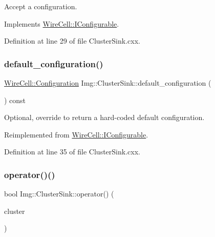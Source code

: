 Accept a configuration. 



Implements \hyperlink{class_wire_cell_1_1_i_configurable_a57ff687923a724093df3de59c6ff237d}{Wire\+Cell\+::\+I\+Configurable}.



Definition at line 29 of file Cluster\+Sink.\+cxx.

\mbox{\label{class_wire_cell_1_1_img_1_1_cluster_sink_a78a90dd617b3aad0933c1d0f8fc055a7}} 
\subsubsection{\texorpdfstring{default\+\_\+configuration()}{default\_configuration()}}
{\footnotesize\ttfamily \hyperlink{namespace_wire_cell_a9f705541fc1d46c608b3d32c182333ee}{Wire\+Cell\+::\+Configuration} Img\+::\+Cluster\+Sink\+::default\+\_\+configuration (\begin{DoxyParamCaption}{ }\end{DoxyParamCaption}) const\hspace{0.3cm}{\ttfamily [virtual]}}



Optional, override to return a hard-\/coded default configuration. 



Reimplemented from \hyperlink{class_wire_cell_1_1_i_configurable_a54841b2da3d1ea02189478bff96f7998}{Wire\+Cell\+::\+I\+Configurable}.



Definition at line 35 of file Cluster\+Sink.\+cxx.

\mbox{\label{class_wire_cell_1_1_img_1_1_cluster_sink_aacf43e19e297947a4dd80e54ee8775f6}} 
\subsubsection{\texorpdfstring{operator()()}{operator()()}}
{\footnotesize\ttfamily bool Img\+::\+Cluster\+Sink\+::operator() (\begin{DoxyParamCaption}\item[{const \hyperlink{class_wire_cell_1_1_i_data_aff870b3ae8333cf9265941eef62498bc}{I\+Cluster\+::pointer} \&}]{cluster }\end{DoxyParamCaption})\hspace{0.3cm}{\ttfamily [virtual]}}



